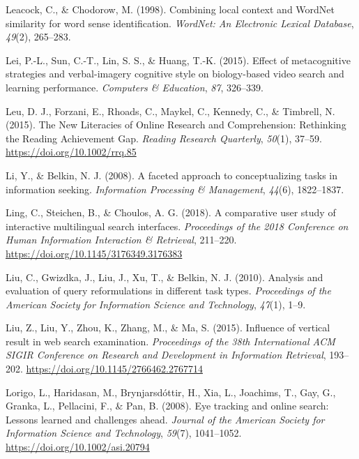 \documentclass[letterpaper, nobind]{templates/ociamthesis}
\newlength{\cslhangindent}
\newenvironment{CSLReferences}[2] %
 {%
  \setlength{\parindent}{0pt}
  \ifodd #1
  \let\oldpar\par
  \def\par{\hangindent=\cslhangindent\oldpar}
  \fi
  \setlength{\parskip}{1mm}
  \setlength{\baselineskip}{6mm}
 }%
 {}
\begin{document}
\begin{CSLReferences}{1}{0}
\leavevmode{}%
Leacock, C., \& Chodorow, M. (1998). Combining local context and WordNet similarity for word sense identification. \emph{WordNet: An Electronic Lexical Database}, \emph{49}(2), 265--283.

\leavevmode{}%
Lei, P.-L., Sun, C.-T., Lin, S. S., \& Huang, T.-K. (2015). Effect of metacognitive strategies and verbal-imagery cognitive style on biology-based video search and learning performance. \emph{Computers \& Education}, \emph{87}, 326--339.

\leavevmode{}%
Leu, D. J., Forzani, E., Rhoads, C., Maykel, C., Kennedy, C., \& Timbrell, N. (2015). The {New Literacies} of {Online Research} and {Comprehension}: Rethinking the {Reading Achievement Gap}. \emph{Reading Research Quarterly}, \emph{50}(1), 37--59. \url{https://doi.org/10.1002/rrq.85}

\leavevmode{}%
Li, Y., \& Belkin, N. J. (2008). A faceted approach to conceptualizing tasks in information seeking. \emph{Information Processing \& Management}, \emph{44}(6), 1822--1837.

\leavevmode{}%
Ling, C., Steichen, B., \& Choulos, A. G. (2018). A comparative user study of interactive multilingual search interfaces. \emph{Proceedings of the 2018 Conference on Human Information Interaction \& Retrieval}, 211--220. \url{https://doi.org/10.1145/3176349.3176383}

\leavevmode{}%
Liu, C., Gwizdka, J., Liu, J., Xu, T., \& Belkin, N. J. (2010). Analysis and evaluation of query reformulations in different task types. \emph{Proceedings of the American Society for Information Science and Technology}, \emph{47}(1), 1--9.

\leavevmode{}%
Liu, Z., Liu, Y., Zhou, K., Zhang, M., \& Ma, S. (2015). Influence of vertical result in web search examination. \emph{Proceedings of the 38th International {ACM SIGIR} Conference on Research and Development in Information Retrieval}, 193--202. \url{https://doi.org/10.1145/2766462.2767714}

\leavevmode{}%
Lorigo, L., Haridasan, M., Brynjarsdóttir, H., Xia, L., Joachims, T., Gay, G., Granka, L., Pellacini, F., \& Pan, B. (2008). Eye tracking and online search: {Lessons} learned and challenges ahead. \emph{Journal of the American Society for Information Science and Technology}, \emph{59}(7), 1041--1052. \url{https://doi.org/10.1002/asi.20794}


\end{CSLReferences}
\end{document}
